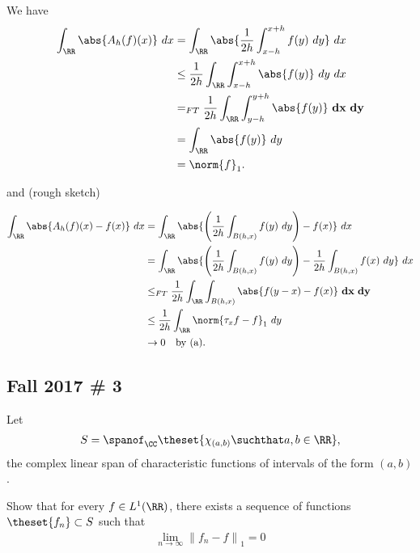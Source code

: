 \begin{solution}
We have \begin{align*}
\int_\RR \abs{A_h(f)(x)} ~dx 
&= \int_\RR \abs{\frac{1}{2h} \int_{x-h}^{x+h} f(y)~dy} ~dx \\
&\leq \frac{1}{2h} \int_\RR \int_{x-h}^{x+h} \abs{f(y)} ~dy ~dx    \\
&=_{FT} \frac{1}{2h} \int_\RR \int_{y-h}^{y+h} \abs{f(y)} ~\mathbf{dx} ~\mathbf{dy}    \\
&= \int_\RR \abs{f(y)} ~{dy} \\
&= \norm{f}_1
.\end{align*}

and (rough sketch)

\begin{align*}
\int_\RR \abs{A_h(f)(x) - f(x)} ~dx 
&= \int_\RR \abs{ \left(\frac{1}{2h} \int_{B(h, x)} f(y)~dy\right) - f(x)}~dx \\
&= \int_\RR \abs{ \left(\frac{1}{2h} \int_{B(h, x)} f(y)~dy\right) - \frac{1}{2h}\int_{B(h, x)} f(x) ~dy}~dx \\
&\leq_{FT} \frac{1}{2h} \int_\RR  \int_{B(h, x)}\abs{ f(y-x) - f(x)} ~\mathbf{dx} ~\mathbf{dy} \\
&\leq \frac 1 {2h} \int_\RR \norm{\tau_x f - f}_1 ~dy \\
&\to 0 \quad\text{by (a)}
.\end{align*}

\end{solution}

\hypertarget{fall-2017-3}{%
\subsection{Fall 2017 \# 3}\label{fall-2017-3}}

Let
\begin{align*}
S = \spanof_\CC\theset{\chi_{(a, b)} \suchthat a, b \in \RR},
\end{align*} the complex linear span of characteristic functions of
intervals of the form \((a, b)\).

Show that for every \(f\in L^1(\RR)\), there exists a sequence of
functions \(\theset{f_n} \subset S\) such that
\begin{align*}
\lim _{n \rightarrow \infty}\left\|f_{n}-f\right\|_{1}=0
\end{align*}

